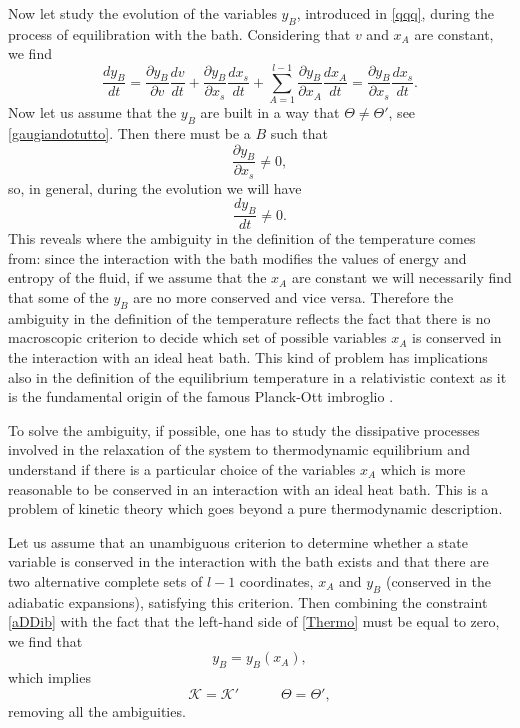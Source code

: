 \documentclass[useAMS,usenatbib,prd,twocolumn,nofootinbib]{revtex4-1}
\newcommand{\spc}{\quad \quad \quad}
\begin{document}
Now let study the evolution of the variables $y_B$, introduced in \eqref{qqq}, during the process of equilibration with the bath. Considering that $v$ and $x_A$ are constant, we find
\begin{equation}\label{Thermo}
\dfrac{dy_B}{dt} = \dfrac{\partial y_B}{\partial v} \dfrac{dv}{dt} + \dfrac{\partial y_B}{\partial x_s} \dfrac{d x_s}{dt} +\sum_{A=1}^{l-1} \dfrac{\partial y_B}{\partial x_A} \dfrac{dx_A}{dt} = \dfrac{\partial y_B}{\partial x_s} \dfrac{d x_s}{dt}.
\end{equation}
Now let us assume that the $y_B$ are built in a way that $\Theta \neq \Theta'$, see \eqref{gaugiandotutto}. Then there must be a $B$ such that
\begin{equation}
\dfrac{\partial y_{B}}{\partial x_s} \neq 0,
\end{equation}
so, in general, during the evolution we will have
\begin{equation}
\dfrac{dy_B}{dt} \neq 0.
\end{equation}
This reveals where the ambiguity in the definition of the temperature comes from: since the interaction with the bath modifies the values of energy and entropy of the fluid, if we assume that the $x_A$ are constant we will necessarily find that some of the $y_B$ are no more conserved and vice versa. Therefore the ambiguity in the definition of the temperature reflects the fact that there is no  macroscopic criterion to decide which set of possible variables $x_A$ is conserved in the interaction with an ideal heat bath. This kind of problem has implications also in the definition of the equilibrium temperature in a relativistic context as it is the fundamental origin of the famous Planck-Ott imbroglio \citep{gavassino2020zeroth}. 

To solve the ambiguity, if possible, one has to study the dissipative processes involved in the relaxation of the system to thermodynamic equilibrium and understand if there is a particular choice of the variables $x_A$ which is more reasonable to be conserved in an interaction with an ideal heat bath. This is a problem of kinetic theory which goes beyond a pure thermodynamic description. 

Let us assume that an unambiguous criterion to determine whether a state variable is conserved in the interaction with the bath exists and that there are two alternative complete sets of $l-1$ coordinates, $x_A$ and $y_B$ (conserved in the adiabatic expansions), satisfying this criterion. Then combining the constraint \eqref{aDDib} with the fact that the left-hand side of \eqref{Thermo} must be equal to zero, we find that
\begin{equation}\label{gaugeperfetto}
y_B = y_B (x_A),
\end{equation} 
which implies
\begin{equation}\label{invv}
\mathcal{K} = \mathcal{K}'  \spc  \Theta = \Theta',
\end{equation}
removing all the ambiguities. 
\end{document}
